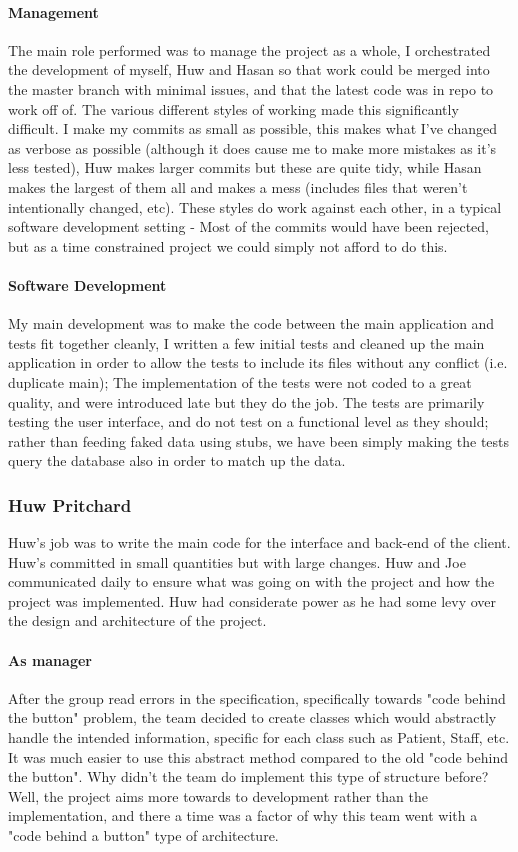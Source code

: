\documentclass{unitemplate}
\begin{document}
\paragraph{Management} The main role performed was to manage the project as a whole, I orchestrated the development of myself, Huw and Hasan so that work could be merged into the master branch with minimal issues, and that the latest code was in repo to work off of. The various different styles of working made this significantly difficult. I make my commits as small as possible, this makes what I've changed as verbose as possible (although it does cause me to make more mistakes as it's less tested), Huw makes larger commits but these are quite tidy, while Hasan makes the largest of them all and makes a mess (includes files that weren't intentionally changed, etc). These styles do work against each other, in a typical software development setting - Most of the commits would have been rejected, but as a time constrained project we could simply not afford to do this.

\paragraph{Software Development} My main development was to make the code between the main application and tests fit together cleanly, I written a few initial tests and cleaned up the main application in order to allow the tests to include its files without any conflict (i.e. duplicate main); The implementation of the tests were not coded to a great quality, and were introduced late but they do the job. The tests are primarily testing the user interface, and do not test on a functional level as they should; rather than feeding faked data using stubs, we have been simply making the tests query the database also in order to match up the data.

\clearpage
\subsubsection{Huw Pritchard}
Huw's job was to write the main code for the interface and back-end of the client. Huw's committed in small quantities but with large changes. Huw and Joe communicated daily to ensure what was going on with the project and how the project was implemented. Huw had considerate power as he had some levy over the design and architecture of the project.

\paragraph{As manager}
After the group read errors in the specification, specifically towards "code behind the button" problem, the team decided to create classes which would abstractly handle the intended information, specific for each class such as Patient, Staff, etc. It was much easier to use this abstract method compared to the old "code behind the button". Why didn't the team do implement this type of structure before? Well, the project aims more towards to development rather than the implementation, and there a time was a factor of why this team went with a "code behind a button" type of architecture.
\end{document}
